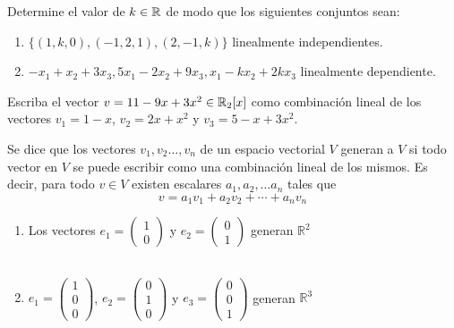 \begin{ejer}
Determine el valor de $k \in \mathbb{R}$ de modo que los siguientes conjuntos sean:
\begin{enumerate}
    \item $\{ (1, k, 0), (-1,2,1), (2, -1, k) \}$ linealmente independientes.
    \item ${ -x_1 + x_2 + 3x_3, 5x_1- 2x_2 + 9x_3, x_1 - kx_2+ 2kx_3 } $ linealmente dependiente.
\end{enumerate}
\end{ejer}

\begin{ejer}
Escriba el vector $v = 11 - 9x + 3x^2 \in \mathbb{R}_2[x]$ como combinación lineal de los vectores $v_1 = 1 - x $, $v_2 = 2x + x^2$ y $v_3 = 5 - x + 3x^2$.
\end{ejer}

\begin{defin}
Se dice que los vectores $v_1, v_2 \dots , v_n$ de un espacio vectorial $V$ generan a $V$ si todo vector en $V$ se puede escribir como una combinación lineal de los mismos. Es decir, para todo $v \in V$ existen escalares $a_1,a_2, \dots a_n$ tales que
$$v = a_1 v_1 + a_2 v_2 + \cdots + a_n v_n$$
\end{defin}

\begin{ejem}
\begin{enumerate}
\item
Los vectores $e_1 = \begin{pmatrix} 1 \\ 0 \end{pmatrix}$ y $e_2 = \begin{pmatrix} 0 \\ 1 \end{pmatrix}$ generan $\mathbb{R}^2$
\\\

\item
$e_1 = \begin{pmatrix} 1 \\ 0 \\ 0\end{pmatrix}$, $e_2 = \begin{pmatrix} 0 \\ 1 \\ 0 \end{pmatrix}$ y $e_3 = \begin{pmatrix} 0 \\ 0 \\ 1 \end{pmatrix}$ generan $\mathbb{R}^3$
\end{enumerate}
\end{ejem}





